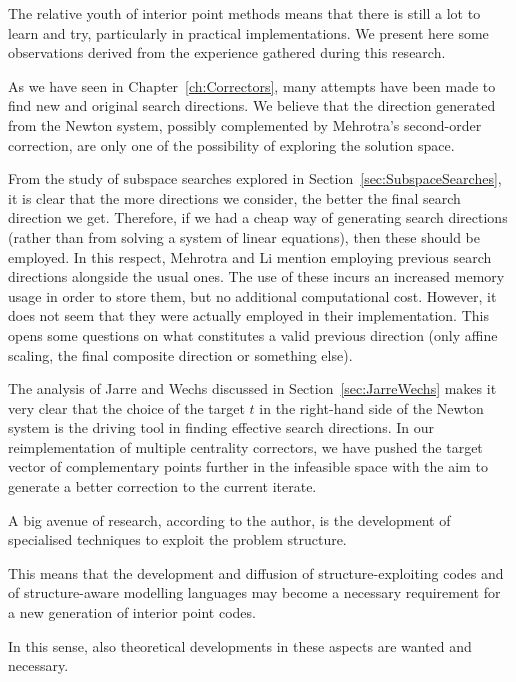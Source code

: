 
%
%
\label{ch:Conclusions}

The relative youth of interior point methods means that there is still
a lot to learn and try, particularly in practical implementations.
We present here some observations derived from the experience
gathered during this research.

As we have seen in Chapter~\ref{ch:Correctors}, many attempts
have been made to find new and original search directions.
We believe that the direction generated from the Newton system,
possibly complemented by Mehrotra's second-order correction,
are only one of the possibility of exploring the solution space.

From the study of subspace searches explored in
Section~\ref{sec:SubspaceSearches}, it is clear that the more 
directions we consider, the better the final search direction 
we get. Therefore, if we had a cheap way of generating search
directions (rather than from solving a system of linear equations),
then these should be employed.
In this respect, Mehrotra and Li \cite{MehrotraLi} 
mention employing previous search directions alongside the usual ones. 
The use of these incurs an increased memory usage 
in order to store them, but no additional computational cost.
However, it does not seem that they were actually employed in
their implementation.
This opens some questions on what constitutes a valid
previous direction (only affine scaling, the final composite direction
or something else).

The analysis of Jarre and Wechs discussed in Section~\ref{sec:JarreWechs}
makes it very clear that the choice of the target $t$ in
the right-hand side of the Newton system is the driving
tool in finding effective search directions.
In our reimplementation of multiple centrality correctors, we
have pushed the target vector of complementary points further
in the infeasible space with the aim to generate a better
correction to the current iterate.

A big avenue of research, according to the author, is the development
of specialised techniques to exploit the problem structure.

This means that the development and diffusion of structure-exploiting
codes and of structure-aware modelling languages may become a necessary
requirement for a new generation of interior point codes.

In this sense, also theoretical developments in these aspects are 
wanted and necessary.
